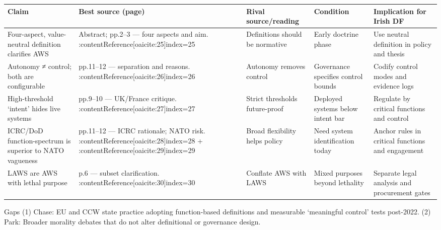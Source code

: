 \usepackage{array}
\begin{tabular}{p{3.2cm}p{4.2cm}p{3.6cm}p{3.2cm}p{4.2cm}}
	\textbf{Claim} & \textbf{Best source (page)} & \textbf{Rival source/reading} & \textbf{Condition} & \textbf{Implication for Irish DF}\\\hline
	Four-aspect, value-neutral definition clarifies AWS & Abstract; pp.2–3 — four aspects and aim. {\small :contentReference[oaicite:25]{index=25}} & Definitions should be normative & Early doctrine phase & Use neutral definition in policy and thesis \\
	Autonomy ≠ control; both are configurable & pp.11–12 — separation and reasons. {\small :contentReference[oaicite:26]{index=26}} & Autonomy removes control & Governance specifies control bounds & Codify control modes and evidence logs \\
	High-threshold ‘intent’ hides live systems & pp.9–10 — UK/France critique. {\small :contentReference[oaicite:27]{index=27}} & Strict thresholds future-proof & Deployed systems below intent bar & Regulate by critical functions and control \\
	ICRC/DoD function-spectrum is superior to NATO vagueness & pp.11–12 — ICRC rationale; NATO risk. {\small :contentReference[oaicite:28]{index=28} {\tiny +} :contentReference[oaicite:29]{index=29}} & Broad flexibility helps policy & Need system identification today & Anchor rules in critical functions and engagement \\
	LAWS are AWS with lethal purpose & p.6 — subset clarification. {\small :contentReference[oaicite:30]{index=30}} & Conflate AWS with LAWS & Mixed purposes beyond lethality & Separate legal analysis and procurement gates \\\hline
\end{tabular}


Gaps
(1) Chase: EU and CCW state practice adopting function-based definitions and measurable ‘meaningful control’ tests post-2022.
(2) Park: Broader morality debates that do not alter definitional or governance design.

\parencite{PORAT_2016}


